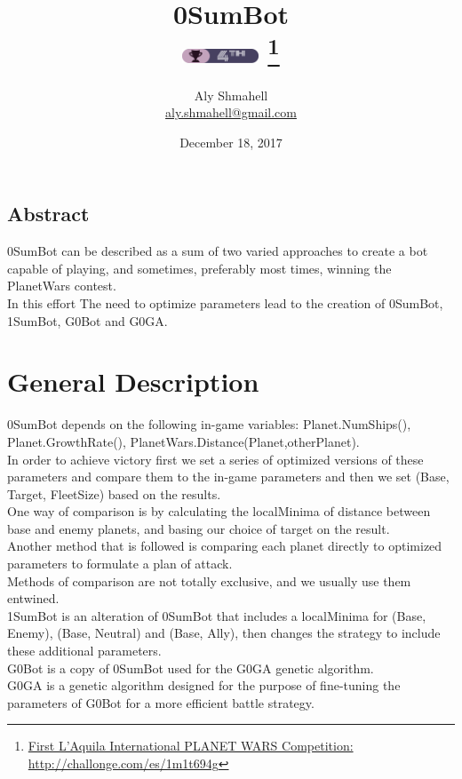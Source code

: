\documentclass[12pt]{scrartcl}
\begin{document}
	\title{%
		0SumBot\\[1ex]
		\includegraphics[width=64pt,height=12pt]{badge.png} 
		\footnote{\href{http://challonge.com/es/1m1t694g}{First L'Aquila International PLANET WARS Competition: http://challonge.com/es/1m1t694g}}
	}
	\author{Aly Shmahell\\%
		\href{aly.shmahell@gmail.com}{aly.shmahell@gmail.com}
	}
	\date{December 18, 2017}
	
	\maketitle	
	\newpage
	\begin{center}
		\section*{\hfil \hfil  Abstract \hfil }
	\end{center}
		0SumBot can be described as a sum of two varied approaches to create a bot capable of playing, and sometimes, preferably most times, winning the PlanetWars contest.\\
		In this effort The need to optimize parameters lead to the creation of 0SumBot, 1SumBot, G0Bot and G0GA.
		
    \newpage
	\section*{\textbf{General Description}}
		0SumBot depends on the following in-game variables: Planet.NumShips(), Planet.GrowthRate(), PlanetWars.Distance(Planet,otherPlanet).\\
		In order to achieve victory first we set a series of optimized versions of these parameters and compare them to the in-game parameters and then we set (Base, Target, FleetSize) based on the results.\\
		One way of comparison is by calculating the localMinima of distance between base and enemy planets, and basing our choice of target on the result.\\
		Another method that is followed is comparing each planet directly to optimized parameters to formulate a plan of attack.\\
		Methods of comparison are not totally exclusive, and we usually use them entwined.\\
		1SumBot is an alteration of 0SumBot that includes a localMinima for (Base, Enemy), (Base, Neutral) and (Base, Ally), then changes the strategy to include these additional parameters.\\
		G0Bot is a copy of 0SumBot used for the G0GA genetic algorithm.\\
		G0GA is a genetic algorithm designed for the purpose of fine-tuning the parameters of G0Bot for a more efficient battle strategy.
\end{document}
